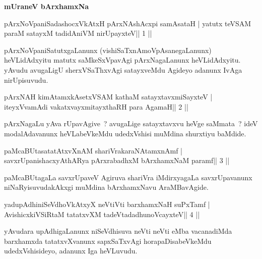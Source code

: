 {\centerline{\textbf{mUraneV bArxhamxNa}}}
\medskip

\begin{shl}
pArxNoVpaniSadashocxVkAtxH pArxNAshAcxpi samAsataH |
yatutx teVSAM paraM satayxM tadidAniVM nirUpayxteV\hfill || 1 ||
\end{shl}

\begin{artha}
pArxNoVpaniSatutxgaLanunx (vishiSaTxnAmoVpAsanegaLanunx) heVLidAdxyitu matutx saMkeSxVpavAgi pArxNagaLanunx heVLidAdxyitu. yAvudu avugaLigU sherxVSaThxvAgi satayxveMdu Agideyo adanunx IvAga nirUpisuvudu.
\end{artha}

\begin{shl}
pArxNAH kimAtamxkAsetxVSAM kathaM satayxtavxmiSayxteV |
iteyxVvamAdi vakatxvayxmitayxthaRH para AgamaH\hfill || 2 ||
\end{shl}

\begin{artha}
pArxNagaLu yAva rUpavAgive~? avugaLige satayxtavxvu heVge saMmata~? ideV modalAdavanunx heVLabeVkeMdu udedxVshisi muMdina shurxtiyu baMdide.
\end{artha}



\begin{shl}
paMcaBUtasatatAtxvXnAM shariVrakaraNAtamxnAmf |
savxrUpanishacxyAthARya pArxrabadhxM bArxhamxNaM paramf\hfill || 3 ||
\end{shl}

\begin{artha}
paMcaBUtagaLa savxrUpaveV Agiruva shariVra iMdirxyagaLa savxrUpavanunx niNaRyisuvudakAkxgi muMdina bArxhamxNavu AraMBavAgide.
\end{artha}




\begin{shl}
yadupAdhiniSeVdhoVkAtxyX neVtiVti barxhamxNaH suPxTamf |
AvishicxkiVSiRtaM tatatxvXM tadeVtadadhunoVcayxteV\hfill || 4 ||
\end{shl}

\begin{artha}
yAvudara upAdhigaLanunx niSeVdhisuva neVti neVti eMba vacanadiMda barxhamxda tatatxvXvanunx sapxSaTxvAgi horapaDisabeVkeMdu udedxVshisideyo, adanunx Iga heVLuvudu.
\end{artha}

